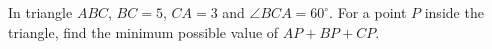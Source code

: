 In triangle \(ABC\), \(BC=5\), \(CA=3\) and \(\angle BCA=60^\circ\). For a point \(P\) inside the triangle, find the minimum possible value of \(AP+BP+CP\).
